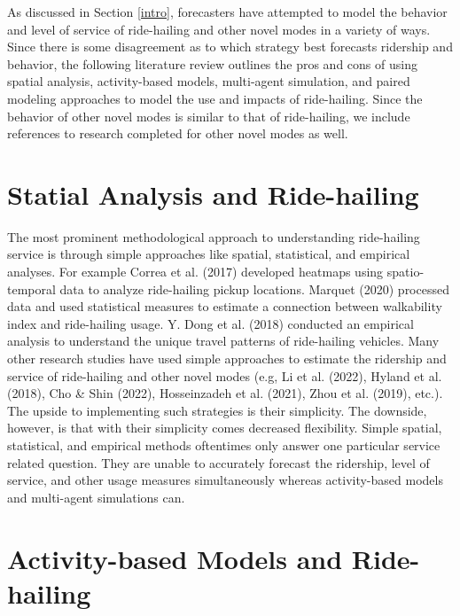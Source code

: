 \documentclass[fancy, masters]{byuthesis}
\begin{document}
As discussed in Section \ref{intro}, forecasters have attempted to model the behavior and level of service of ride-hailing and other novel modes in a variety of ways. Since there is some disagreement as to which strategy best forecasts ridership and behavior, the following literature review outlines the pros and cons of using spatial analysis, activity-based models, multi-agent simulation, and paired modeling approaches to model the use and impacts of ride-hailing. Since the behavior of other novel modes is similar to that of ride-hailing, we include references to research completed for other novel modes as well.

\hypertarget{lit-simp}{%
\section{Statial Analysis and Ride-hailing}\label{lit-simp}}

The most prominent methodological approach to understanding ride-hailing service is through simple approaches like spatial, statistical, and empirical analyses. For example Correa et al. (2017) developed heatmaps using spatio-temporal data to analyze ride-hailing pickup locations. Marquet (2020) processed data and used statistical measures to estimate a connection between walkability index and ride-hailing usage. Y. Dong et al. (2018) conducted an empirical analysis to understand the unique travel patterns of ride-hailing vehicles. Many other research studies have used simple approaches to estimate the ridership and service of ride-hailing and other novel modes (e.g, Li et al. (2022), Hyland et al. (2018), Cho \& Shin (2022), Hosseinzadeh et al. (2021), Zhou et al. (2019), etc.). The upside to implementing such strategies is their simplicity. The downside, however, is that with their simplicity comes decreased flexibility. Simple spatial, statistical, and empirical methods oftentimes only answer one particular service related question. They are unable to accurately forecast the ridership, level of service, and other usage measures simultaneously whereas activity-based models and multi-agent simulations can.

\hypertarget{lit-abm}{%
\section{Activity-based Models and Ride-hailing}\label{lit-abm}}
\end{document}
